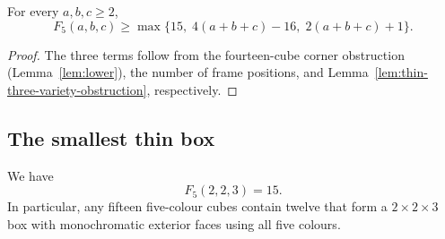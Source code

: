\begin{proposition}\label{cor:all-lower-bounds}
For every $a,b,c\ge2$,
\[
 F_5(a,b,c)\ge\max\{15,\;4(a+b+c)-16,\;2(a+b+c)+1\}.
\]
\end{proposition}
\begin{proof}
The three terms follow from the fourteen-cube corner obstruction (Lemma~\ref{lem:lower}),
the number of frame positions, and
Lemma~\ref{lem:thin-three-variety-obstruction}, respectively.
\end{proof}

\subsection{The smallest thin box}

\begin{theorem}\label{thm:223}
We have
\[
 F_5(2,2,3)=15.
\]
In particular, any fifteen five-colour cubes contain twelve that form a
$2\times2\times3$ box with monochromatic exterior faces using all five
colours.
\end{theorem}

